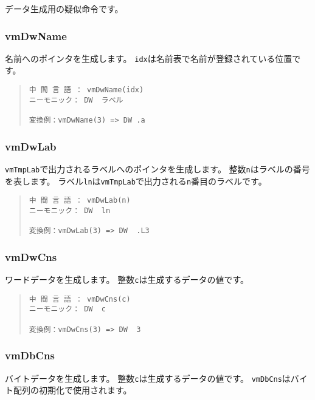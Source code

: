 データ生成用の疑似命令です。

\subsubsection{vmDwName}

名前へのポインタを生成します。
\verb/idx/は名前表で名前が登録されている位置です。

\begin{quote}
\begin{verbatim}
中 間 言 語 ： vmDwName(idx)
ニーモニック： DW  ラベル

変換例：vmDwName(3) => DW .a
\end{verbatim}
\end{quote}

\subsubsection{vmDwLab}

\verb/vmTmpLab/で出力されるラベルへのポインタを生成します。
整数\verb/n/はラベルの番号を表します。
ラベル\verb/ln/は\verb/vmTmpLab/で出力される\verb/n/番目のラベルです。

\begin{quote}
\begin{verbatim}
中 間 言 語 ： vmDwLab(n)
ニーモニック： DW  ln   

変換例：vmDwLab(3) => DW  .L3
\end{verbatim}
\end{quote}

\subsubsection{vmDwCns}

ワードデータを生成します。
整数\verb/c/は生成するデータの値です。

\begin{quote}
\begin{verbatim}
中 間 言 語 ： vmDwCns(c)
ニーモニック： DW  c   

変換例：vmDwCns(3) => DW  3
\end{verbatim}
\end{quote}

\subsubsection{vmDbCns}

バイトデータを生成します。
整数\verb/c/は生成するデータの値です。
\verb/vmDbCns/はバイト配列の初期化で使用されます。

